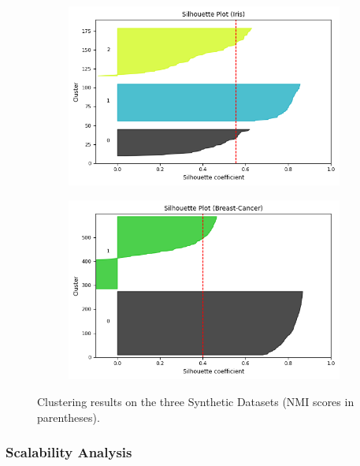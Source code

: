 \begin{figure}[htb]
    \centering
    \begin{subfigure}[b]{0.49\textwidth}
        \centering
        \includegraphics[width=\textwidth]{../results/plots/Iris.png}
    \end{subfigure}
    \hfill
    \begin{subfigure}[b]{0.49\textwidth}
        \centering
        \includegraphics[width=\textwidth]{../results/plots/Breast-Cancer.png}
    \end{subfigure}

    \caption{Clustering results on the three Synthetic Datasets (NMI scores in parentheses).}
    \label{fig:silhouette}
\end{figure}

\subsubsection{Scalability Analysis}

